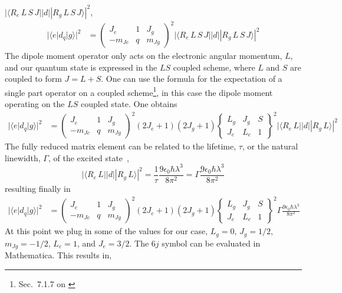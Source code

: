 \documentclass[11pt,letter]{article}
\begin{document}
\newpage


$|\langle R_{e}\, L\,S\,J || d || R_{g}\,
L\,S\,J
\rangle|^{2}$, 
\begin{align} |\langle e | d_{q} | g \rangle|^{2} & =
\begin{pmatrix} J_{e} & 1 & J_{g} \\ -m_{Je} & q & m_{Jg} \end{pmatrix}^{2}
|\langle R_{e}\, L\,S\,J || d || R_{g}\, L\,S\,J \rangle|^{2} 
\end{align} 
The
dipole moment operator only acts on the electronic angular momentum, $L$, and
our quantum state is expressed in the $LS$ coupled scheme, where $L$ and $S$
are coupled to form $J=L+S$.  One can use the formula for the expectation of a
single part operator on a coupled scheme\footnote{Sec.~7.1.7 on
\cite{edmonds1996angular}}, in this case the dipole moment operating on the
$LS$ coupled state. One obtains \begin{align} |\langle e | d_{q} | g
\rangle|^{2} & = \begin{pmatrix} J_{e} & 1 & J_{g} \\ -m_{Je} & q & m_{Jg}
\end{pmatrix}^{2} (2J_{e}+1)(2J_{g}+1)  \begin{Bmatrix}L_{g} & J_{g} & S \\
J_{e} & L_{e} & 1 \end{Bmatrix}^{2}|\langle R_{e}\, L || d || R_{g}\, L
\rangle|^{2} \end{align} The fully reduced matrix element can be related to the
lifetime, $\tau$, or the natural linewidth, $\Gamma$, of the excited
state~\cite{Olivares:98}, \[ |\langle R_{e}\, L || d || R_{g}\, L \rangle|^{2}
= \frac{1}{\tau} \frac{ 9\epsilon_{0} \hbar \lambda^{3}}{8 \pi^{2}} =
\Gamma\frac{ 9\epsilon_{0} \hbar \lambda^{3}}{8 \pi^{2}} \] resulting finally
in \begin{align} |\langle e | d_{q} | g \rangle|^{2} & = \begin{pmatrix} J_{e}
& 1 & J_{g} \\ -m_{Je} & q & m_{Jg} \end{pmatrix}^{2} (2J_{e}+1)(2J_{g}+1)
\begin{Bmatrix}L_{g} & J_{g} & S \\ J_{e} & L_{e} & 1
\end{Bmatrix}^{2}\Gamma\frac{ 9\epsilon_{0} \hbar \lambda^{3}}{8 \pi^{2}}
\end{align} At this point we plug in some of the values for our case,
$L_{g}=0$, $J_{g} = 1/2$, $m_{Jg}=-1/2$, $L_{e}=1$, and $J_{e}=3/2$.  The $6j$
symbol can be evaluated in Mathematica.  This results in,
\end{document}
